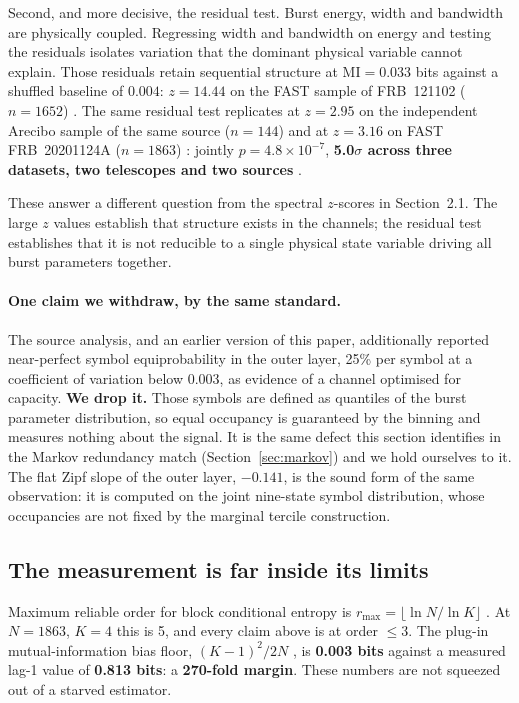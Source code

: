 \documentclass[11pt,a4paper]{article}
\newcommand{\bnum}[1]{\textbf{#1}}
\begin{document}
Second, and more decisive, the residual test. Burst energy, width and bandwidth are
physically coupled. Regressing width and bandwidth on energy and testing the residuals
isolates variation that the dominant physical variable cannot explain. Those residuals
retain sequential structure at $\mathrm{MI} = 0.033$ bits against a shuffled baseline of
$0.004$: $z = 14.44$ on the FAST sample of FRB~121102 ($n = 1652$) \cite{li2021}. The
same residual test replicates at $z = 2.95$ on the independent Arecibo sample of the
same source ($n = 144$) \cite{aggarwal2021} and at $z = 3.16$ on FAST FRB~20201124A
($n = 1863$) \cite{wang2023}: jointly $p = 4.8\times10^{-7}$, \textbf{5.0$\sigma$
across three datasets, two telescopes and two sources} \cite{meucci2026}.

These answer a different question from the spectral $z$-scores in Section~2.1. The
large $z$ values establish that structure exists in the channels; the residual test
establishes that it is not reducible to a single physical state variable driving all
burst parameters together.

\paragraph{One claim we withdraw, by the same standard.} The source analysis, and an
earlier version of this paper, additionally reported near-perfect symbol
equiprobability in the outer layer, 25\% per symbol at a coefficient of variation
below 0.003, as evidence of a channel optimised for capacity. \textbf{We drop it.}
Those symbols are defined as quantiles of the burst parameter distribution, so equal
occupancy is guaranteed by the binning and measures nothing about the signal. It is
the same defect this section identifies in the Markov redundancy match
(Section~\ref{sec:markov}) and we hold ourselves to it. The flat Zipf slope of the
outer layer, $-0.141$, is the sound form of the same observation: it is computed on
the joint nine-state symbol distribution, whose occupancies are not fixed by the
marginal tercile construction.

\subsection{The measurement is far inside its limits}

Maximum reliable order for block conditional entropy is
$r_{\max} = \lfloor \ln N / \ln K \rfloor$ \cite{degregorio2026}. At $N = 1863$, $K = 4$
this is 5, and every claim above is at order $\leq 3$. The plug-in mutual-information
bias floor, $(K-1)^2/2N$ \cite{paninski2003}, is \bnum{0.003 bits} against a measured
lag-1 value of \bnum{0.813 bits}: a \bnum{270-fold margin}. These numbers are not
squeezed out of a starved estimator.
\end{document}
